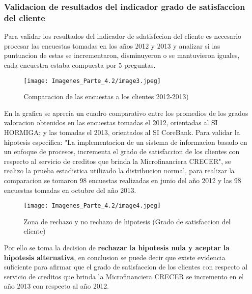 \documentclass[12 pt, letterpaper]{article}
\begin{document}
\subsubsection{Validacion de resultados del indicador grado de satisfaccion del cliente}
Para validar los resultados del indicador de sdatisfccion del cliente es necesario procesar las encuestas tomadas en los años 2012 y 2013 y analizar si las puntuacion de estas se incrementaron, disminuyeron o se mantuvieron iguales, cada encuestra estaba compuesta por 5 preguntas.
\begin{figure}[H]
    \texttt{[image: Imagenes\_Parte\_4.2/image3.jpeg]}
    \caption{Comparacion de las encuestas a los clientes 2012-2013)}
\end{figure}
En la grafica se aprecia un cuadro comparativo entre los promedios de los grados valoracion obtenidos en las encuestas tomadas el 2012, orientadas al SI HORMIGA; y las tomadas el 2013, orientados al SI CoreBank.
Para validar la hipotesis especifica: "La implementacion de un sistema de informacion basado en un enfoque de procesos, incrementa el grado de satisfaccion de los clientes con respecto al servicio de creditos que brinda la Microfinanciera CRECER", se realizo la prueba estadistica utilizado la distribucion normal, para realizar la comparacion se tomaron 98 encuestas realizadas en junio del año 2012 y las 98 encuestas tomadas en octubre del año 2013.


\begin{figure}[h]
    \centering
    \texttt{[image: Imagenes\_Parte\_4.2/image4.jpeg]}
    \label{Maps}
    \caption{Zona de rechazo y no rechazo de hipotesis (Grado de satisfaccion del cliente) }
   \end{figure}

Por ello se toma la decision de \textbf{rechazar la hipotesis nula y aceptar la hipotesis alternativa}, en conclusion se puede decir que existe evidencia suficiente para afirmar que el grado de satisfaccion de los clientes con respecto al servicio de creditos que brinda la Microfinanciera CRECER se incremento en el año 2013 con respecto al año 2012.
\end{document}
